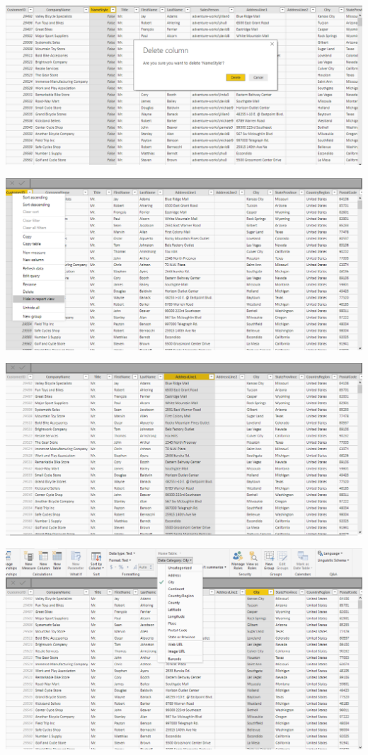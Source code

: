 	\begin{center}
	\includegraphics[width=15cm]{./images/power6}
	\end{center}	

	\begin{center}
	\includegraphics[width=15cm]{./images/power7}
	\end{center}	

	\begin{center}
	\includegraphics[width=15cm]{./images/power8}
	\end{center}	

	\begin{center}
	\includegraphics[width=15cm]{./images/power9}
	\end{center}	

